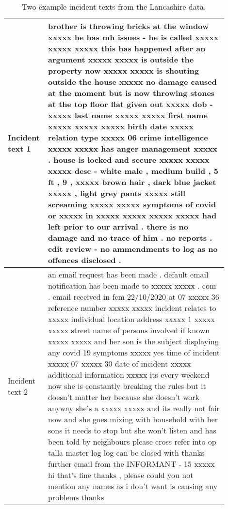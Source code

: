 \begin{table}[]
\centering
\begin{tabular}{p{0.1\linewidth}p{0.8\linewidth}}

\toprule
Incident text 1 &  brother is throwing bricks at the window xxxxx he has mh issues - he is called xxxxx xxxxx xxxxx this has happened after an argument xxxxx xxxxx is outside the property now xxxxx xxxxx is shouting outside the house xxxxx no damage caused at the moment but is now throwing stones at the top floor flat given out xxxxx dob - xxxxx last name xxxxx xxxxx first name xxxxx xxxxx xxxxx birth date xxxxx relation type xxxxx 06 crime intelligence xxxxx xxxxx has anger management xxxxx . house is locked and secure xxxxx xxxxx xxxxx desc - white male , medium build , 5 ft , 9 , xxxxx brown hair , dark blue jacket xxxxx , light grey pants xxxxx still screaming xxxxx xxxxx symptoms of covid or xxxxx in xxxxx xxxxx xxxxx xxxxx had left prior to our arrival . there is no damage and no trace of him . no reports . cdit review - no ammendments to log as no offences disclosed .                                                             \\ \midrule
Incident text 2 & an email request has been made . default email notification has been made to xxxxx xxxxx . com . email received in fcm 22/10/2020 at 07 xxxxx 36 reference number xxxxx xxxxx incident relates to xxxxx individual location address xxxxx 1 xxxxx xxxxx street name of persons involved if known xxxxx xxxxx and her son is the subject displaying any covid 19 symptoms xxxxx yes time of incident xxxxx 07 xxxxx 30 date of incident xxxxx additional information xxxxx its every weekend now she is constantly breaking the rules but it doesn't matter her because she doesn't work anyway she's a xxxxx xxxxx and its really not fair now and she goes mixing with household with her sons it needs to stop but she won't listen and has been told by neighbours please cross refer into op talla master log log can be closed with thanks further email from the INFORMANT - 15 xxxxx hi that's fine thanks , please could you not mention any names as i don't want is causing any problems thanks \\ \bottomrule
\end{tabular}
\caption{\label{tab:example_incident} Two example incident texts from the Lancashire data.}
\end{table}




